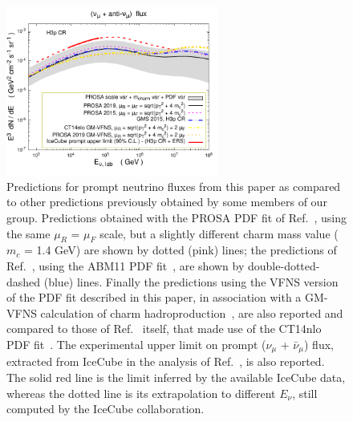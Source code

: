 \documentclass[12pt]{article}
\begin{document}
\begin{figure}
\centering
    \includegraphics[width=0.62\textwidth]{figs/fluxcompa_prosa19abmmicicecube_verynew2_py8.pdf}
  \caption{\label{fig3prompt} 
Predictions for prompt neutrino fluxes from this paper as compared to other predictions previously obtained by some members of our group. Predictions obtained with the PROSA PDF fit of Ref.~\cite{Zenaiev:2015rfa}, using the same $\mu_R$ = $\mu_F$ scale, but a slightly different charm mass value ($m_c$ = 1.4 GeV) are shown by dotted (pink) lines; the predictions of Ref.~\cite{Garzelli:2015psa}, using the ABM11 PDF fit~\cite{Alekhin:2012ig}, are shown by double-dotted-dashed (blue) lines. Finally the predictions using the VFNS version of the PDF fit described in this paper, in association with a GM-VFNS calculation of charm hadroproduction~\cite{Benzke:2017yjn}, are also reported and compared to those of Ref.~\cite{Benzke:2017yjn} itself, that made use of the CT14nlo PDF fit~\cite{Dulat:2015mca}. 
The experimental upper limit on prompt ($\nu_\mu$ + $\bar{\nu}_\mu$) flux, extracted from IceCube in the analysis of Ref.~\cite{Aartsen:2016xlq}, is also reported. The solid red line is the limit inferred by the available IceCube data, whereas the dotted line is its extrapolation to different $E_\nu$, still computed by the IceCube collaboration.}
\end{figure}
\end{document}
